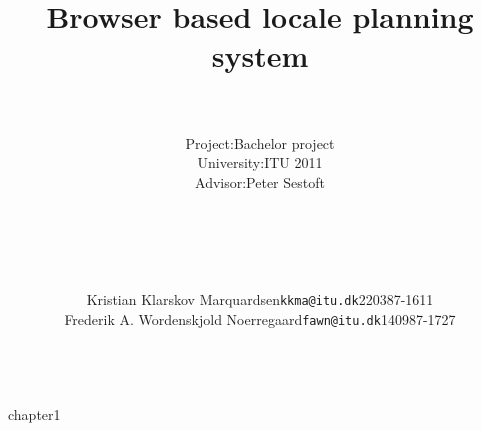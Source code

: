 \documentclass[12pt,a4paper]{report}
\begin{document}

\title{\Huge{\textsf{\textbf{Browser based locale planning system}}}}
\author{
		\hline \\
		\begin{tabular}{ l l }
		Project: & Bachelor project \\
		University: & ITU 2011 \\
		Advisor: & Peter Sestoft\\
		\end{tabular}\\
		\mbox{} \\
		\hline \\
		\mbox{}\\
		\begin{tabular} { l l l }
				Kristian Klarskov Marquardsen & \texttt{kkma@itu.dk} &220387-1611\\
				Frederik A. Wordenskjold Noerregaard & \texttt{fawn@itu.dk} & 140987-1727\\
		\end{tabular}\\
		\mbox{}}
\date{}
\maketitle

\tableofcontents

{chapter1}
\appendix
\end{document}
